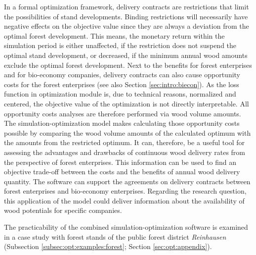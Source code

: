 In a formal optimization framework, delivery contracts are restrictions that limit the possibilities of stand developments. Binding restrictions will necessarily have negative effects on the objective value since they are always a deviation from the optimal forest development. This means, the monetary return within the simulation period is either unaffected, if the restriction does not suspend the optimal stand development, or decreased, if the minimum annual wood amounts exclude the optimal forest development. Next to the benefits for forest enterprises and for bio-economy companies, delivery contracts can also cause opportunity costs for the forest enterprises (see also Section \ref{sec:intro:biecon}). As the loss function in optimization module is, due to technical reasons, normalized and centered, the objective value of the optimization is not directly interpretable. All opportunity costs analyses are therefore performed via wood volume amounts. The si\-mu\-la\-tion-op\-ti\-mi\-za\-tion model makes calculating those opportunity costs possible by comparing the wood volume amounts of the calculated optimum with the amounts from the restricted optimum. It can, therefore, be a useful tool for assessing the advantages and drawbacks of continuous wood delivery rates from the perspective of forest enterprises. This information can be used to find an objective trade-off between the costs and the benefits of annual wood delivery quantity. The software can support the agreements on delivery contracts between forest enterprises and bio-economy enterprises. Regarding the research question, this application of the model could deliver information about the availability of wood potentials for specific companies.

The practicability of the combined si\-mu\-la\-tion-op\-ti\-mi\-za\-tion software is examined in a case study with forest stands of the public forest district \textit{Reinhausen} \citep{nlf_2017} (Subsection \ref{subsec:opt:examples:forest}; Section \ref{sec:opt:appendix}).
